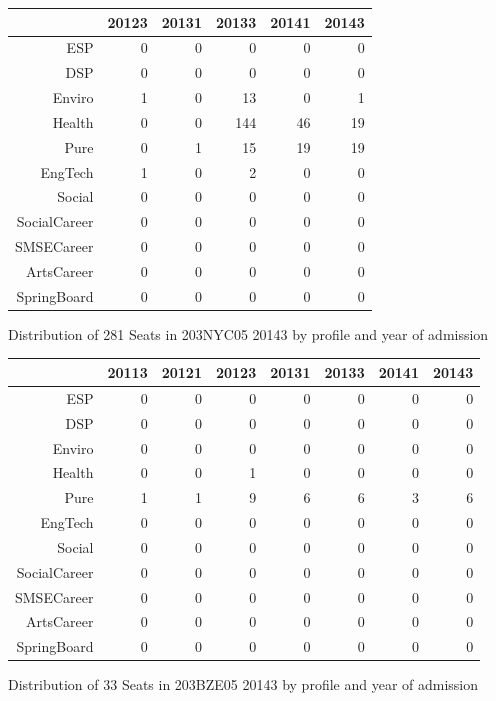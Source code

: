 \documentclass{article}\usepackage[]{graphicx}\usepackage[]{color}
\makeatletter
\newenvironment{kframe}{%
 \def\at@end@of@kframe{}%
 \ifinner\ifhmode%
  \def\at@end@of@kframe{\end{minipage}}%
  \begin{minipage}{\columnwidth}%
 \fi\fi%
 \def\FrameCommand##1{\hskip\@totalleftmargin \hskip-\fboxsep
 \colorbox{shadecolor}{##1}\hskip-\fboxsep
     \hskip-\linewidth \hskip-\@totalleftmargin \hskip\columnwidth}%
 \MakeFramed {\advance\hsize-\width
   \@totalleftmargin\z@ \linewidth\hsize
   \@setminipage}}%
 {\par\unskip\endMakeFramed%
 \at@end@of@kframe}
\makeatother
\begin{document}
\begin{figure}[H]
\centering
\begin{tabular}{rrrrrr}
  \hline
 & 20123 & 20131 & 20133 & 20141 & 20143 \\ 
  \hline
ESP &   0 &   0 &   0 &   0 &   0 \\ 
  DSP &   0 &   0 &   0 &   0 &   0 \\ 
  Enviro &   1 &   0 &  13 &   0 &   1 \\ 
  Health &   0 &   0 & 144 &  46 &  19 \\ 
  Pure &   0 &   1 &  15 &  19 &  19 \\ 
  EngTech &   1 &   0 &   2 &   0 &   0 \\ 
  Social &   0 &   0 &   0 &   0 &   0 \\ 
  SocialCareer &   0 &   0 &   0 &   0 &   0 \\ 
  SMSECareer &   0 &   0 &   0 &   0 &   0 \\ 
  ArtsCareer &   0 &   0 &   0 &   0 &   0 \\ 
  SpringBoard &   0 &   0 &   0 &   0 &   0 \\ 
   \hline
\end{tabular}
\caption{Distribution of 281 Seats in 203NYC05 20143 by profile and year of admission} 
\end{figure}
\begin{kframe}

{\ttfamily\noindent\bfseries\color{errorcolor}{\#\# Error in characters | factors: operations are possible only for numeric, logical or complex types}}\end{kframe}%
\begin{figure}[H]
\centering
\begin{tabular}{rrrrrrrr}
  \hline
 & 20113 & 20121 & 20123 & 20131 & 20133 & 20141 & 20143 \\ 
  \hline
ESP &   0 &   0 &   0 &   0 &   0 &   0 &   0 \\ 
  DSP &   0 &   0 &   0 &   0 &   0 &   0 &   0 \\ 
  Enviro &   0 &   0 &   0 &   0 &   0 &   0 &   0 \\ 
  Health &   0 &   0 &   1 &   0 &   0 &   0 &   0 \\ 
  Pure &   1 &   1 &   9 &   6 &   6 &   3 &   6 \\ 
  EngTech &   0 &   0 &   0 &   0 &   0 &   0 &   0 \\ 
  Social &   0 &   0 &   0 &   0 &   0 &   0 &   0 \\ 
  SocialCareer &   0 &   0 &   0 &   0 &   0 &   0 &   0 \\ 
  SMSECareer &   0 &   0 &   0 &   0 &   0 &   0 &   0 \\ 
  ArtsCareer &   0 &   0 &   0 &   0 &   0 &   0 &   0 \\ 
  SpringBoard &   0 &   0 &   0 &   0 &   0 &   0 &   0 \\ 
   \hline
\end{tabular}
\caption{Distribution of 33 Seats in 203BZE05 20143 by profile and year of admission} 
\end{figure}
\end{document}
